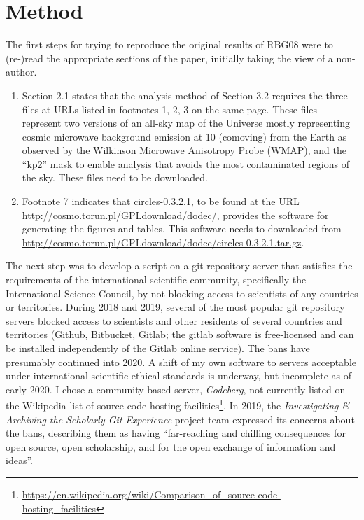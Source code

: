 \section{Method}

The first steps for trying to reproduce the original results
of RBG08 were to (re-)read the appropriate sections of the paper,
initially taking the view of a non-author.
\begin{enumerate}
\item
  Section 2.1\supercite{RBG08} states that the analysis method of
  Section 3.2 requires the three files at URLs listed in footnotes 1,
  2, 3 on the same page. These files represent two versions of an
  all-sky map of the Universe mostly representing cosmic microwave
  background emission at 10{\hGpc} (comoving) from the Earth as
  observed by the Wilkinson Microwave Anisotropy Probe
  (WMAP)\supercite{WMAP5Hinshaw}, and the ``kp2'' mask to enable
  analysis that avoids the most contaminated regions of the sky. These
  files need to be downloaded.
\item
  Footnote 7\supercite{RBG08} indicates that {\sc circles-0.3.2.1}, to
  be found at the URL \url{http://cosmo.torun.pl/GPLdownload/dodec/},
  provides the software for generating the figures and tables. This
  software needs to downloaded from
  \url{http://cosmo.torun.pl/GPLdownload/dodec/circles-0.3.2.1.tar.gz}.
\end{enumerate}

The next step was to develop a script on a {\sc git} repository server
that satisfies the requirements of the international scientific
community, specifically the International Science
Council\supercite{ISCFreedoms}, by not blocking access to scientists
of any countries or territories.  During 2018 and 2019, several of the
most popular {\sc git} repository servers blocked access to scientists
and other residents of several countries and territories
(Github\supercite{Github2020ToS,TechCrunch2019github,Zdnet2019github},
Bitbucket\supercite{Atlassian2019bitbucket},
Gitlab\supercite{Gitlab2018ban}; the {\sc gitlab} software is free-licensed
and can be installed independently of the Gitlab online service).
The bans have presumably continued into 2020.
A shift of my own software to servers acceptable under international
scientific ethical standards is underway, but incomplete as of early
2020. I chose a community-based server, {\em Codeberg}, not currently listed
on the Wikipedia list of source code hosting
facilities\footnote{\url{https://en.wikipedia.org/wiki/Comparison_of_source-code-hosting_facilities}}.
In 2019, the {\em Investigating \& Archiving the Scholarly Git Experience} project team
expressed its concerns about the bans, describing them as having ``far-reaching and chilling consequences
for open source, open scholarship, and for the open exchange of information and ideas''\supercite{IASGE2019}.


